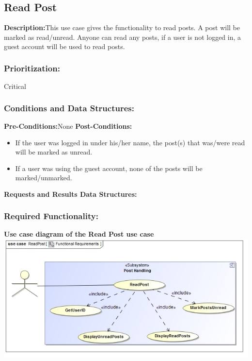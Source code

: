\documentclass[a4paper,11pt]{article}
\begin{document}
\subsection{Read Post}
\textbf{Description:}This use case gives the functionality to read posts. A post will be marked as read/unread. Anyone can read any posts, if a user is not logged in, a guest account will be used to read posts.
\subsubsection{Prioritization:} Critical
\subsubsection{Conditions and Data Structures:}
\textbf{Pre-Conditions:}None
\textbf{Post-Conditions:}
\begin{itemize}
	\item If the user was logged in under his/her name, the post(s) that was/were read will be marked as unread.
	\item If a user was using the guest account, none of the posts will be marked/unmarked.
\end{itemize}
\textbf{Requests and Results Data Structures:}
\subsubsection{Required Functionality:} 
\textbf{Use case diagram of the Read Post use case}\\
\includegraphics[width=1\linewidth]{./Images/PostHandling/postRead.jpg}\\
\end{document}

